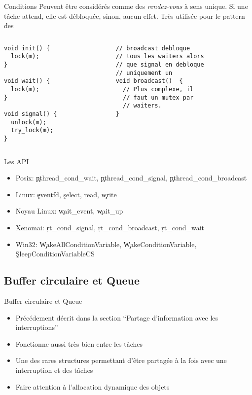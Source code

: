 \begin{frame}[fragile]{Conditions}
  Peuvent  être   considérés  comme  des   \emph{rendez-vous}  à  sens
  unique. Si une tâche attend, elle est débloquée, sinon, aucun effet.
  Très utilisée pour le pattern des 
  \begin{columns}
    \begin{column}{5cm}
      \begin{lstlisting}
void init() {
  lock(m);
}

void wait() {
  lock(m);
}

void signal() {
  unlock(m);
  try_lock(m);
}
      \end{lstlisting}
    \end{column}
    \begin{column}{5.5cm}
      \begin{lstlisting}
// broadcast debloque
// tous les waiters alors
// que signal en debloque
// uniquement un
void broadcast()  {
  // Plus complexe, il
  // faut un mutex par
  // waiters.
}
      \end{lstlisting}
    \end{column}
  \end{columns}
\end{frame}

\begin{frame}[fragile=singleslide]{Les API}
  \begin{itemize}
  \item    Posix:    \c{pthread_cond_wait},   \c{pthread_cond_signal},
    \c{pthread_cond_broadcast}
  \item Linux: \c{eventfd}, \c{select}, \c{read}, \c{write}
  \item Noyau Linux: \c{wait_event}, \c{wait_up}
  \item Xenomai: \c{rt_cond_signal}, \c{rt_cond_broadcast}, \c{rt_cond_wait}
  \item              Win32:              \c{WakeAllConditionVariable},
    \c{WakeConditionVariable}, \c{SleepConditionVariableCS}
  \end{itemize}
\end{frame}

\subsection{Buffer circulaire et Queue}

\begin{frame}[fragile]{Buffer circulaire et Queue}
  \begin{itemize}
  \item  Précédement décrit dans  la section  ``Partage d'information
    avec les interruptions''
  \item Fonctionne aussi très bien entre les tâches
  \item Une  des rares structures  permettant d'être partagée à  la fois
    avec une interruption et des tâches
  \item Faire attention à l'allocation dynamique des objets
  \end{itemize}
\end{frame}

